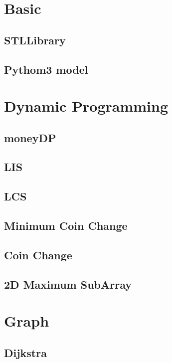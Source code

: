 \section{Basic}
\subsection{STLLibrary}

\subsection{Pythom3 model}


\section{Dynamic Programming}
\subsection{moneyDP}

\subsection{LIS}

\subsection{LCS}

\subsection{Minimum Coin Change}

\subsection{Coin Change}

\subsection{2D Maximum SubArray}


\section{Graph}
\subsection{Dijkstra}

